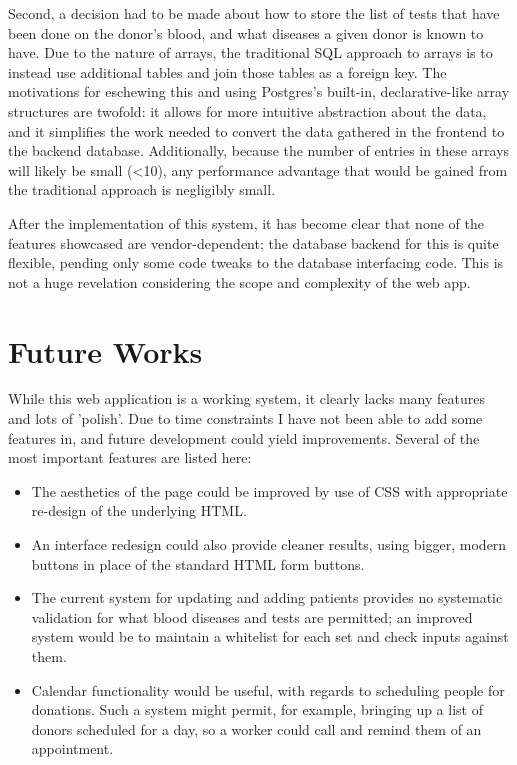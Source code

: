 \documentclass[runningheads,a4paper]{llncs}
\begin{document}
Second, a decision had to be made about how to store the list of tests
that have been done on the donor's blood, and what diseases a given
donor is known to have. Due to the nature of arrays, the traditional
SQL approach to arrays is to instead use additional tables and join
those tables as a foreign key. The motivations for eschewing this and
using Postgres's built-in, declarative-like array structures are
twofold: it allows for more intuitive abstraction about the data, and
it simplifies the work needed to convert the data gathered in the
frontend to the backend database. Additionally, because the number of
entries in these arrays will likely be small (<10), any performance
advantage that would be gained from the traditional approach is
negligibly small.

After the implementation of this system, it has become clear that none
of the features showcased are vendor-dependent; the database backend
for this is quite flexible, pending only some code tweaks to the
database interfacing code. This is not a huge revelation considering
the scope and complexity of the web app.
\section{Future Works}\label{sec:fworks}
While this web application is a working system, it clearly lacks many features and lots of 'polish'. Due to time constraints I have not been able to add some features in, and future development could yield improvements. Several of the most important features are listed here:
\begin{itemize}
\item The aesthetics of the page could be improved by use of CSS with appropriate re-design of the underlying HTML.
\item An interface redesign could also provide cleaner results, using bigger, modern buttons in place of the standard HTML form buttons.
\item The current system for updating and adding patients provides no systematic validation for what blood diseases and tests are permitted; an improved system would be to maintain a whitelist for each set and check inputs against them.
\item Calendar functionality would be useful, with regards to scheduling people for donations. Such a system might permit, for example, bringing up a list of donors scheduled for a day, so a worker could call and remind them of an appointment.
\end{itemize}
\end{document}
